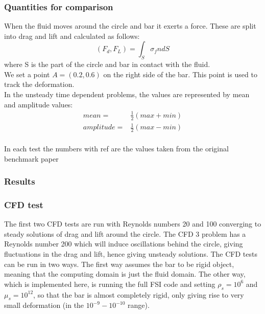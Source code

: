 \subsubsection*{Quantities for comparison}
When the fluid moves around the circle and bar it exerts a force. These are split into drag and lift and calculated as follows:
$$ (F_d, F_L) = \int_S \sigma_f n dS $$ 
where S is the part of the circle and bar in contact with the fluid. \\
We set a point $A = (0.2,0.6)$ on the right side of the bar. This point is used to track the deformation. \\
In the unsteady time dependent problems, the values are represented by mean and amplitude values:
\begin{align}
mean =& \frac{1}{2} (max + min) \\
amplitude =& \frac{1}{2} (max - min)\\
\end{align}

In each test the numbers with ref are the values taken from the original benchmark paper \cite{Hron2006a}

\subsubsection{Results}
\subsubsection{CFD test}
The first two CFD tests are run with Reynolds numbers 20 and 100 converging to steady solutions of drag and lift around the circle. The CFD 3 problem has a Reynolds number 200 which will induce oscillations behind the circle, giving fluctuations in the drag and lift, hence giving unsteady solutions.
The CFD tests can be run in two ways. The first way assumes the bar to be rigid object, meaning that the computing domain is just the fluid domain. The other way, which is implemented here, is running the full FSI code and setting $\rho_s=10^{6}$ and $\mu_s=10^{12}$, so that the bar is almost completely rigid, only giving rise to very small deformation (in the $10^{-9}-10^{-10}$ range).

